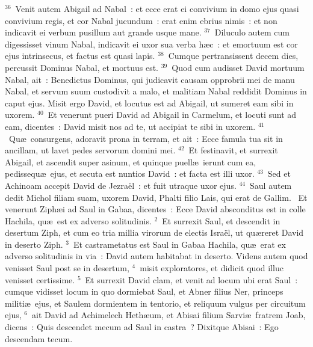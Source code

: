 ${}^{36}$~Venit autem Abigail ad Nabal~: et ecce erat ei convivium in domo ejus quasi convivium regis, et cor Nabal jucundum~: erat enim ebrius nimis~: et non indicavit ei verbum pusillum aut grande usque mane.
${}^{37}$~Diluculo autem cum digessisset vinum Nabal, indicavit ei uxor sua verba h\ae c~: et emortuum est cor ejus intrinsecus, et factus est quasi lapis.
${}^{38}$~Cumque pertransissent decem dies, percussit Dominus Nabal, et mortuus est.
${}^{39}$~Quod cum audisset David mortuum Nabal, ait~: Benedictus Dominus, qui judicavit causam opprobrii mei de manu Nabal, et servum suum custodivit a malo, et malitiam Nabal reddidit Dominus in caput ejus. Misit ergo David, et locutus est ad Abigail, ut sumeret eam sibi in uxorem.
${}^{40}$~Et venerunt pueri David ad Abigail in Carmelum, et locuti sunt ad eam, dicentes~: David misit nos ad te, ut accipiat te sibi in uxorem.
${}^{41}$~Qu\ae\ consurgens, adoravit prona in terram, et ait~: Ecce famula tua sit in ancillam, ut lavet pedes servorum domini mei.
${}^{42}$~Et festinavit, et surrexit Abigail, et ascendit super asinum, et quinque puell\ae\ ierunt cum ea, pedissequ\ae\ ejus, et secuta est nuntios David~: et facta est illi uxor.
${}^{43}$~Sed et Achinoam accepit David de Jezra\"el~: et fuit utraque uxor ejus.
${}^{44}$~Saul autem dedit Michol filiam suam, uxorem David, Phalti filio Lais, qui erat de Gallim.
~Et venerunt Ziph\ae i ad Saul in Gabaa, dicentes~: Ecce David absconditus est in colle Hachila, qu\ae\ est ex adverso solitudinis.
${}^{2}$~Et surrexit Saul, et descendit in desertum Ziph, et cum eo tria millia virorum de electis Isra\"el, ut qu\ae reret David in deserto Ziph.
${}^{3}$~Et castrametatus est Saul in Gabaa Hachila, qu\ae\ erat ex adverso solitudinis in via~: David autem habitabat in deserto. Videns autem quod venisset Saul post se in desertum,
${}^{4}$~misit exploratores, et didicit quod illuc venisset certissime.
${}^{5}$~Et surrexit David clam, et venit ad locum ubi erat Saul~: cumque vidisset locum in quo dormiebat Saul, et Abner filius Ner, princeps militi\ae\ ejus, et Saulem dormientem in tentorio, et reliquum vulgus per circuitum ejus,
${}^{6}$~ait David ad Achimelech Heth\ae um, et Abisai filium Sarvi\ae\ fratrem Joab, dicens~: Quis descendet mecum ad Saul in castra~? Dixitque Abisai~: Ego descendam tecum.


